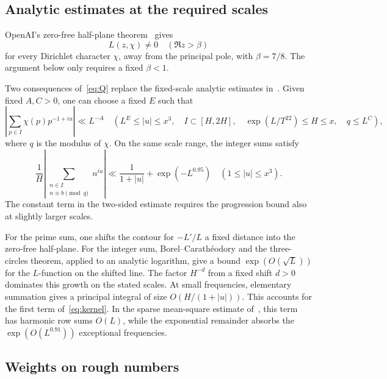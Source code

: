 \documentclass[10pt]{article}
\begin{document}
\subsection{Analytic estimates at the required scales}

OpenAI's zero-free half-plane theorem~\cite[Theorem~1.1]{QRH} gives
\begin{equation}\label{eq:Q}
 L(z,\chi)\ne0\quad(\Re z>\beta)
\end{equation}
for every Dirichlet character $\chi$, away from the principal pole, with $\beta=7/8$. The argument below only requires a fixed $\beta<1$.

Two consequences of~\eqref{eq:Q} replace the fixed-scale analytic estimates in~\cite{PD}. Given fixed $A,C>0$, one can choose a fixed $E$ such that
\begin{equation}\label{eq:prime-twist}
 \left|\sum_{p\in I}\chi(p)p^{-1+iu}\right|\ll L^{-A}
 \quad\left(L^E\leq|u|\leq x^3,\quad
     I\subset[H,2H],\quad \exp(L/T^{22})\leq H\leq x,\quad q\leq L^C\right),
\end{equation}
where $q$ is the modulus of $\chi$. On the same scale range, the integer sums satisfy
\begin{equation}\label{eq:kernel}
 \frac1H\left|\sum_{\substack{n\in I\\n\equiv b\pmod q}}n^{iu}\right|
 \ll\frac1{1+|u|}+\exp(-L^{0.95})
 \quad(1\leq|u|\leq x^3).
\end{equation}
The constant term in the two-sided estimate requires the progression bound also at slightly larger scales.

For the prime sum, one shifts the contour for $-L'/L$ a fixed distance into the zero-free half-plane. For the integer sum, Borel--Carath\'eodory and the three-circles theorem, applied to an analytic logarithm, give a bound $\exp(O(\sqrt L))$ for the $L$-function on the shifted line. The factor $H^{-d}$ from a fixed shift $d>0$ dominates this growth on the stated scales. At small frequencies, elementary summation gives a principal integral of size $O(H/(1+|u|))$. This accounts for the first term of~\eqref{eq:kernel}. In the sparse mean-square estimate of~\cite[Section~6]{PD}, this term has harmonic row sums $O(L)$, while the exponential remainder absorbs the $\exp(O(L^{0.91}))$ exceptional frequencies.

\subsection{Weights on rough numbers}
\end{document}
